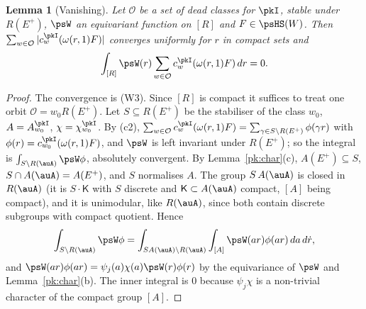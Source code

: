 \documentclass[10pt]{amsart}
\newtheorem{lemma}[theorem]{Lemma}
\theoremstyle{definition}
\theoremstyle{remark}
\begin{document}
\begin{lemma}[Vanishing]\label{pk:vanish}
Let $\mathcal O$ be a set of dead classes for $\pkI$, stable under $R(E^+)$, $\psW$ an equivariant
function on $[R]$ and $F\in\psHS(W)$. Then $\sum_{w\in\mathcal O}|c^{\pkI}_w(\omega(r,1)F)|$
converges uniformly for $r$ in compact sets and
\[
\int_{[R]}\psW(r)\sum_{w\in\mathcal O}c^{\pkI}_w(\omega(r,1)F)\,dr=0 .
\]
\end{lemma}
\begin{proof}
The convergence is (W3). Since $[R]$ is compact it suffices to treat one orbit $\mathcal O=w_0
R(E^+)$. Let $S\subseteq R(E^+)$ be the stabiliser of the class $w_0$, $A=A^{\pkI}_{w_0}$,
$\chi=\chi^{\pkI}_{w_0}$. By (c2), $\sum_{w\in\mathcal O}c^{\pkI}_w(\omega(r,1)F)=\sum_{\gamma\in
S\backslash R(E^+)}\phi(\gamma r)$ with $\phi(r)=c^{\pkI}_{w_0}(\omega(r,1)F)$, and $\psW$ is left
invariant under $R(E^+)$; so the integral is $\int_{S\backslash R(\auA)}\psW\phi$, absolutely
convergent. By Lemma~\ref{pk:char}(c), $A(E^+)\subseteq S$, $S\cap A(\auA)=A(E^+)$, and $S$
normalises $A$. The group $S\,A(\auA)$ is closed in $R(\auA)$ (it is $S\cdot\mathsf K$ with $S$
discrete and $\mathsf K\subset A(\auA)$ compact, $[A]$ being compact), and it is unimodular, like
$R(\auA)$, since both contain discrete subgroups with compact quotient. Hence
\[
\int_{S\backslash R(\auA)}\psW\phi=\int_{SA(\auA)\backslash R(\auA)}\int_{[A]}\psW(ar)\phi(ar)\,da\,
d\dot r,
\]
and $\psW(ar)\phi(ar)=\psi_j(a)\chi(a)\psW(r)\phi(r)$ by the equivariance of $\psW$ and
Lemma~\ref{pk:char}(b). The inner integral is $0$ because $\psi_j\chi$ is a non-trivial character
of the compact group $[A]$.
\end{proof}
\end{document}
